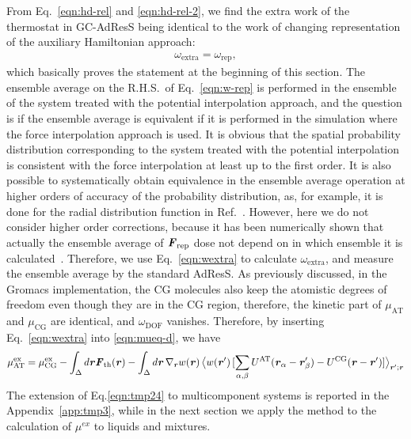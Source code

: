 \documentclass[a4paper,preprint,unsortedaddress]{revtex4-1}
\newcommand{\vect}[1]{\textbf{\textit{#1}}}
\newcommand{\dof}{{\textrm{DOF}}}
\newcommand{\AT}{{\textrm{{AT}}}}
\newcommand{\CG}{{\textrm{CG}}}
\newcommand{\HY}{{\Delta}}
\newcommand{\thf}{{\textrm{th}}}
\newcommand{\res}{{\textrm{rep}}}
\newcommand{\ext}{{\textrm{extra}}}
\newcommand{\exc}{{\textrm{ex}}}
\begin{document}
{From Eq.~\eqref{eqn:hd-rel} and \eqref{eqn:hd-rel-2}, we
find the extra work of the thermostat in GC-AdResS being identical to the work of changing
representation of the auxiliary Hamiltonian approach:
\begin{align}\label{eqn:wextra}
  \omega_\ext = \omega_\res,
\end{align}
which basically proves the statement at the beginning of this section.  The ensemble
average on the R.H.S.~of Eq.~\eqref{eqn:w-rep} is performed in the
ensemble of the system treated with the potential interpolation approach, and the question is if the ensemble average is equivalent if it is performed in the simulation where the force
interpolation approach is used.  It is obvious that the spatial probability distribution corresponding to the system treated with the potential interpolation is consistent with the force
interpolation at least up to the first order.  It is also
possible to systematically obtain equivalence in the ensemble average operation  at higher orders of accuracy of the probability distribution, as, for example, it is done for the radial distribution function in Ref.~\cite{jctchan}.
However, here we do not consider higher order corrections, because it
has been numerically shown that actually the ensemble average of
$\vect F_\res$ dose not depend on in which ensemble it is
calculated~\cite{prx}. Therefore, we use Eq.~\eqref{eqn:wextra} to
calculate $\omega_\ext$, and measure the ensemble average by the
standard AdResS.  As previously discussed, in the Gromacs implementation, the CG
molecules also keep the atomistic degrees of freedom even though they
are in the CG region, therefore, the kinetic part of $\mu_\AT$ and
$\mu_\CG$ are identical, and $\omega_\dof$ vanishes. Therefore,
by inserting Eq.~\eqref{eqn:wextra} into \eqref{eqn:mueq-d}, we have
\begin{align}\label{eqn:tmp24}
  \mu_\AT^\exc = \mu_\CG^\exc - \int_\HY d\vect r \vect F_\thf(\vect r)
-\int_\HY d \vect r\,\nabla_{\vect r}w(\vect r)\,
\big\langle w(\vect r')\, [\sum_{\alpha,\beta}U^\AT(\vect r_\alpha-\vect r'_\beta) - U^\CG(\vect r-\vect r')]\big\rangle_{\vect r'; \vect r}
\end{align}
The extension of Eq.\ref{eqn:tmp24} to multicomponent systems is
reported in the Appendix~\ref{app:tmp3}, while in the next section we
apply the method to the calculation of $\mu^{ex}$ to liquids and
mixtures.}
\end{document}
